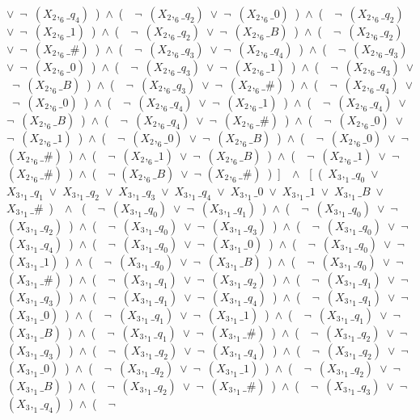 ﻿\documentclass[a4paper,10pt]{article}
\begin{document}
$\vee$\ $\neg$\ $(X_2,_6\_q_4)$\ )\ $\wedge$\ (\ \ $\neg$\ $(X_2,_6\_q_2)$\ $\vee$\ $\neg$\ $(X_2,_6\_0)$\ )\ $\wedge$\ (\ \ $\neg$\ $(X_2,_6\_q_2)$\ $\vee$\ $\neg$\ $(X_2,_6\_1)$\ )\ $\wedge$\ (\ \ $\neg$\ $(X_2,_6\_q_2)$\ $\vee$\ $\neg$\ $(X_2,_6\_B)$\ )\ $\wedge$\ (\ \ $\neg$\ $(X_2,_6\_q_2)$\ $\vee$\ $\neg$\ $(X_2,_6\_\#)$\ )\ $\wedge$\ (\ \ $\neg$\ $(X_2,_6\_q_3)$\ $\vee$\ $\neg$\ $(X_2,_6\_q_4)$\ )\ $\wedge$\ (\ \ $\neg$\ $(X_2,_6\_q_3)$\ $\vee$\ $\neg$\ $(X_2,_6\_0)$\ )\ $\wedge$\ (\ \ $\neg$\ $(X_2,_6\_q_3)$\ $\vee$\ $\neg$\ $(X_2,_6\_1)$\ )\ $\wedge$\ (\ \ $\neg$\ $(X_2,_6\_q_3)$\ $\vee$\ $\neg$\ $(X_2,_6\_B)$\ )\ $\wedge$\ (\ \ $\neg$\ $(X_2,_6\_q_3)$\ $\vee$\ $\neg$\ $(X_2,_6\_\#)$\ )\ $\wedge$\ (\ \ $\neg$\ $(X_2,_6\_q_4)$\ $\vee$\ $\neg$\ $(X_2,_6\_0)$\ )\ $\wedge$\ (\ \ $\neg$\ $(X_2,_6\_q_4)$\ $\vee$\ $\neg$\ $(X_2,_6\_1)$\ )\ $\wedge$\ (\ \ $\neg$\ $(X_2,_6\_q_4)$\ $\vee$\ $\neg$\ $(X_2,_6\_B)$\ )\ $\wedge$\ (\ \ $\neg$\ $(X_2,_6\_q_4)$\ $\vee$\ $\neg$\ $(X_2,_6\_\#)$\ )\ $\wedge$\ (\ \ $\neg$\ $(X_2,_6\_0)$\ $\vee$\ $\neg$\ $(X_2,_6\_1)$\ )\ $\wedge$\ (\ \ $\neg$\ $(X_2,_6\_0)$\ $\vee$\ $\neg$\ $(X_2,_6\_B)$\ )\ $\wedge$\ (\ \ $\neg$\ $(X_2,_6\_0)$\ $\vee$\ $\neg$\ $(X_2,_6\_\#)$\ )\ $\wedge$\ (\ \ $\neg$\ $(X_2,_6\_1)$\ $\vee$\ $\neg$\ $(X_2,_6\_B)$\ )\ $\wedge$\ (\ \ $\neg$\ $(X_2,_6\_1)$\ $\vee$\ $\neg$\ $(X_2,_6\_\#)$\ )\ $\wedge$\ (\ \ $\neg$ $(X_2,_6\_B)$\ $\vee$\ $\neg$ $(X_2,_6\_\#)$\ )\ ]\ \ $\wedge$ \ [\ (\ $X_3,_1\_q_0$\ $\vee$\ $X_3,_1\_q_1$\ $\vee$\ $X_3,_1\_q_2$\ $\vee$\ $X_3,_1\_q_3$\ $\vee$\ $X_3,_1\_q_4$\ $\vee$\ $X_3,_1\_0$\ $\vee$\ $X_3,_1\_1$\ $\vee$\ $X_3,_1\_B$\ $\vee$\ $X_3,_1\_\#$\ )\ \ $\wedge$ \ (\ \ $\neg$\ $(X_3,_1\_q_0)$\ $\vee$\ $\neg$\ $(X_3,_1\_q_1)$\ )\ $\wedge$\ (\ \ $\neg$\ $(X_3,_1\_q_0)$\ $\vee$\ $\neg$\ $(X_3,_1\_q_2)$\ )\ $\wedge$\ (\ \ $\neg$\ $(X_3,_1\_q_0)$\ $\vee$\ $\neg$\ $(X_3,_1\_q_3)$\ )\ $\wedge$\ (\ \ $\neg$\ $(X_3,_1\_q_0)$\ $\vee$\ $\neg$\ $(X_3,_1\_q_4)$\ )\ $\wedge$\ (\ \ $\neg$\ $(X_3,_1\_q_0)$\ $\vee$\ $\neg$\ $(X_3,_1\_0)$\ )\ $\wedge$\ (\ \ $\neg$\ $(X_3,_1\_q_0)$\ $\vee$\ $\neg$\ $(X_3,_1\_1)$\ )\ $\wedge$\ (\ \ $\neg$\ $(X_3,_1\_q_0)$\ $\vee$\ $\neg$\ $(X_3,_1\_B)$\ )\ $\wedge$\ (\ \ $\neg$\ $(X_3,_1\_q_0)$\ $\vee$\ $\neg$\ $(X_3,_1\_\#)$\ )\ $\wedge$\ (\ \ $\neg$\ $(X_3,_1\_q_1)$\ $\vee$\ $\neg$\ $(X_3,_1\_q_2)$\ )\ $\wedge$\ (\ \ $\neg$\ $(X_3,_1\_q_1)$\ $\vee$\ $\neg$\ $(X_3,_1\_q_3)$\ )\ $\wedge$\ (\ \ $\neg$\ $(X_3,_1\_q_1)$\ $\vee$\ $\neg$\ $(X_3,_1\_q_4)$\ )\ $\wedge$\ (\ \ $\neg$\ $(X_3,_1\_q_1)$\ $\vee$\ $\neg$\ $(X_3,_1\_0)$\ )\ $\wedge$\ (\ \ $\neg$\ $(X_3,_1\_q_1)$\ $\vee$\ $\neg$\ $(X_3,_1\_1)$\ )\ $\wedge$\ (\ \ $\neg$\ $(X_3,_1\_q_1)$\ $\vee$\ $\neg$\ $(X_3,_1\_B)$\ )\ $\wedge$\ (\ \ $\neg$\ $(X_3,_1\_q_1)$\ $\vee$\ $\neg$\ $(X_3,_1\_\#)$\ )\ $\wedge$\ (\ \ $\neg$\ $(X_3,_1\_q_2)$\ $\vee$\ $\neg$\ $(X_3,_1\_q_3)$\ )\ $\wedge$\ (\ \ $\neg$\ $(X_3,_1\_q_2)$\ $\vee$\ $\neg$\ $(X_3,_1\_q_4)$\ )\ $\wedge$\ (\ \ $\neg$\ $(X_3,_1\_q_2)$\ $\vee$\ $\neg$\ $(X_3,_1\_0)$\ )\ $\wedge$\ (\ \ $\neg$\ $(X_3,_1\_q_2)$\ $\vee$\ $\neg$\ $(X_3,_1\_1)$\ )\ $\wedge$\ (\ \ $\neg$\ $(X_3,_1\_q_2)$\ $\vee$\ $\neg$\ $(X_3,_1\_B)$\ )\ $\wedge$\ (\ \ $\neg$\ $(X_3,_1\_q_2)$\ $\vee$\ $\neg$\ $(X_3,_1\_\#)$\ )\ $\wedge$\ (\ \ $\neg$\ $(X_3,_1\_q_3)$\ $\vee$\ $\neg$\ $(X_3,_1\_q_4)$\ )\ $\wedge$\ (\ \ $\neg$\ 
\end{document}
